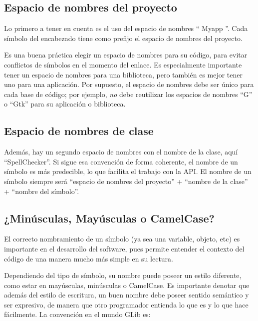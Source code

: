 \subsection{Espacio de nombres del proyecto}
Lo primero a tener en cuenta es el uso del espacio de nombres `` Myapp ''. Cada símbolo del encabezado tiene como prefijo el espacio de nombres del proyecto.

Es una buena práctica elegir un espacio de nombres para su código, para evitar conflictos de símbolos en el momento del enlace. Es especialmente importante tener un espacio de nombres para una biblioteca, pero también es mejor tener uno para una aplicación. Por supuesto, el espacio de nombres debe ser único para cada base de código; por ejemplo, \emph{no} debe reutilizar los espacios de nombres ``G'' o ``Gtk'' para su aplicación o biblioteca.

\subsection{Espacio de nombres de clase}
Además, hay un segundo espacio de nombres con el nombre de la clase, aquí ``SpellChecker''. Si sigue esa convención de forma coherente, el nombre de un símbolo es más predecible, lo que facilita el trabajo con la API. El nombre de un símbolo siempre será ``espacio de nombres del proyecto'' + ``nombre de la clase'' + ``nombre del símbolo''.

\subsection{¿Minúsculas, Mayúsculas o CamelCase?}

El correcto nombramiento de un símbolo (ya sea una variable, objeto, etc) es importante en el desarrollo del software, pues permite entender el contexto del código de una manera mucho más simple en su lectura.

Dependiendo del tipo de símbolo, su nombre puede poseer un estilo diferente, como estar en mayúsculas, minúsculas o CamelCase. Es importante denotar que además del estilo de escritura, un buen nombre debe poseer sentido semántico y ser expresivo, de manera que otro programador entienda lo que es y lo que hace fácilmente. La convención en el mundo GLib es:

